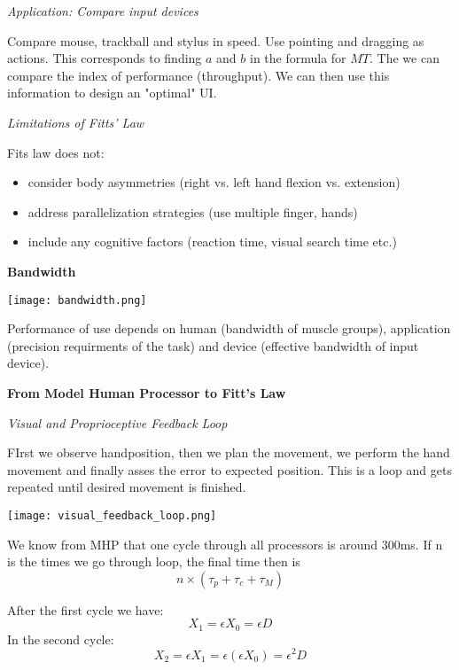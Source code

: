 \textit{Application: Compare input devices} \smallskip

Compare mouse, trackball and stylus in speed. Use pointing and dragging as actions. This corresponds to finding $a$ and $b$ in the formula for $MT$. The we can compare the index of performance (throughput). We can then use this information to design an "optimal" UI. \medskip

\textit{Limitations of Fitts' Law} \smallskip

Fits law does not: 


\begin{itemize}[itemsep=-5pt, topsep=0pt, leftmargin=*]
    \item consider body asymmetries (right vs. left hand flexion vs. extension)
    \item address parallelization strategies (use multiple finger, hands)
    \item include any cognitive factors (reaction time, visual search time etc.)
\end{itemize}
\medskip

\textbf{Bandwidth} \smallskip


\begin{center}
	\texttt{[image: bandwidth.png]}
\end{center}

\medskip

Performance of use depends on human (bandwidth of muscle groups), application (precision requirments of the task) and device (effective bandwidth of input device). \medskip


\textbf{From Model Human Processor to Fitt's Law} \smallskip

\textit{Visual and Proprioceptive Feedback Loop} \smallskip

FIrst we observe handposition, then we plan the movement, we perform the hand movement and finally asses the error to expected position. This is a loop and gets repeated until desired movement is finished. 


\begin{center}
	\texttt{[image: visual\_feedback\_loop.png]}
\end{center}

We know from MHP that one cycle through all processors is around 300ms. If n is the times we go through loop, the final time then is
$$n \times (\tau_p + \tau_c + \tau_M)$$

After the first cycle we have:
$$X_1 = \epsilon X_0 = \epsilon D$$
In the second cycle:
$$X_2 = \epsilon X_1 = \epsilon(\epsilon X_0)= \epsilon^2 D$$

